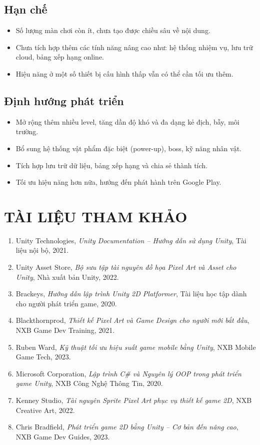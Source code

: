 \documentclass[a4paper,12pt]{article}
\begin{document}
\subsection{Hạn chế}

\begin{itemize}
    \item Số lượng màn chơi còn ít, chưa tạo được chiều sâu về nội dung.
    \item Chưa tích hợp thêm các tính năng nâng cao như: hệ thống nhiệm vụ, lưu trữ cloud, bảng xếp hạng online.
    \item Hiệu năng ở một số thiết bị cấu hình thấp vẫn có thể cần tối ưu thêm.
\end{itemize}

\subsection{Định hướng phát triển}

\begin{itemize}
    \item Mở rộng thêm nhiều level, tăng dần độ khó và đa dạng kẻ địch, bẫy, môi trường.
    \item Bổ sung hệ thống vật phẩm đặc biệt (power-up), boss, kỹ năng nhân vật.
    \item Tích hợp lưu trữ dữ liệu, bảng xếp hạng và chia sẻ thành tích.
    \item Tối ưu hiệu năng hơn nữa, hướng đến phát hành trên Google Play.
\end{itemize}

\newpage

\section*{TÀI LIỆU THAM KHẢO}

\begin{enumerate}
    \item Unity Technologies, \textit{Unity Documentation – Hướng dẫn sử dụng Unity}, Tài liệu nội bộ, 2021.
    \item Unity Asset Store, \textit{Bộ sưu tập tài nguyên đồ họa Pixel Art và Asset cho Unity}, Nhà xuất bản Unity, 2022.
    \item Brackeys, \textit{Hướng dẫn lập trình Unity 2D Platformer}, Tài liệu học tập dành cho người phát triển game, 2020.
    \item Blackthornprod, \textit{Thiết kế Pixel Art và Game Design cho người mới bắt đầu}, NXB Game Dev Training, 2021.
    \item Ruben Ward, \textit{Kỹ thuật tối ưu hiệu suất game mobile bằng Unity}, NXB Mobile Game Tech, 2023.
    \item Microsoft Corporation, \textit{Lập trình C\# và Nguyên lý OOP trong phát triển game Unity}, NXB Công Nghệ Thông Tin, 2020.
    \item Kenney Studio, \textit{Tài nguyên Sprite Pixel Art phục vụ thiết kế game 2D}, NXB Creative Art, 2022.
    \item Chris Bradfield, \textit{Phát triển game 2D bằng Unity – Cơ bản đến nâng cao}, NXB Game Dev Guides, 2023.
\end{enumerate}
\end{document}
